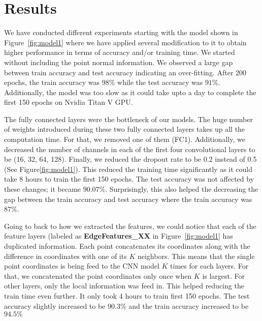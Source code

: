 \section{Results}
We have conducted different experiments starting with the model shown in Figure~\ref{fig:model1} where we have applied several modification to it to obtain higher performance in terms of accuracy and/or training time. We started without including the point normal information. We observed a large gap between train accuracy and test accuracy indicating an over-fitting. After 200 epochs, the train accuracy was $98\%$ while the test accuracy was $91\%$. Additionally, the model was too slow as it could take upto a day to complete the first 150 epochs on Nvidia Titan V GPU. 

The fully connected layers were the bottleneck of our models. The huge number of weights introduced during these two fully connected layers takes up all the computation time. For that, we removed one of them (FC1). Additionally, we decreased the number of channels in each of the first four convolutional layers to be (16, 32, 64, 128). Finally, we reduced the dropout rate to be 0.2 instead of 0.5 (See Figure\ref{fig:model1}). This reduced the training time significantly as it could take 8 hours to train the first 150 epochs. The test accuracy was not affected by these changes; it became $90.07\%$. Surprisingly, this also helped the decreasing the gap between the train accuracy and test accuracy where the train accuracy was $87\%$. 

Going to back to how we extracted the features, we could notice that each of the feature layers (labeled as \textbf{EdgeFeatures\_XX} in Figure~\ref{fig:model1} has duplicated information. Each point concatenates its coordinates along with the difference in coordinates with one of its $K$ neighbors. This means that the single point coordinates is being feed to the CNN model $K$ times for each layers. For that, we concatenated the point coordinates only once when $K$ is largest. For other layers, only the local information was feed in. This helped reducing the train time even further. It only took 4 hours to train first 150 epochs. The test accuracy slightly increased to be $90.3\%$ and the train accuracy increased to be $94.5\%$ 

